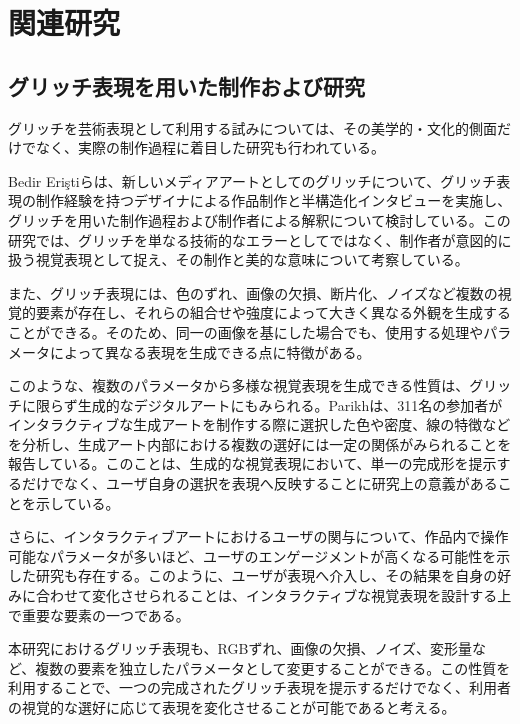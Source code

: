 

\section{関連研究}

\subsection{グリッチ表現を用いた制作および研究}

グリッチを芸術表現として利用する試みについては、その美学的・文化的側面だけでなく、実際の制作過程に着目した研究も行われている。

Bedir Eriştiらは、新しいメディアアートとしてのグリッチについて、グリッチ表現の制作経験を持つデザイナによる作品制作と半構造化インタビューを実施し、グリッチを用いた制作過程および制作者による解釈について検討している\cite{bedireristi2019glitch}。この研究では、グリッチを単なる技術的なエラーとしてではなく、制作者が意図的に扱う視覚表現として捉え、その制作と美的な意味について考察している。

また、グリッチ表現には、色のずれ、画像の欠損、断片化、ノイズなど複数の視覚的要素が存在し、それらの組合せや強度によって大きく異なる外観を生成することができる。そのため、同一の画像を基にした場合でも、使用する処理やパラメータによって異なる表現を生成できる点に特徴がある。

このような、複数のパラメータから多様な視覚表現を生成できる性質は、グリッチに限らず生成的なデジタルアートにもみられる。Parikhは、311名の参加者がインタラクティブな生成アートを制作する際に選択した色や密度、線の特徴などを分析し、生成アート内部における複数の選好には一定の関係がみられることを報告している\cite{parikh2020preferences}。このことは、生成的な視覚表現において、単一の完成形を提示するだけでなく、ユーザ自身の選択を表現へ反映することに研究上の意義があることを示している。

さらに、インタラクティブアートにおけるユーザの関与について、作品内で操作可能なパラメータが多いほど、ユーザのエンゲージメントが高くなる可能性を示した研究も存在する\cite{interactiveArtEngagement}。このように、ユーザが表現へ介入し、その結果を自身の好みに合わせて変化させられることは、インタラクティブな視覚表現を設計する上で重要な要素の一つである。

本研究におけるグリッチ表現も、RGBずれ、画像の欠損、ノイズ、変形量など、複数の要素を独立したパラメータとして変更することができる。この性質を利用することで、一つの完成されたグリッチ表現を提示するだけでなく、利用者の視覚的な選好に応じて表現を変化させることが可能であると考える。


